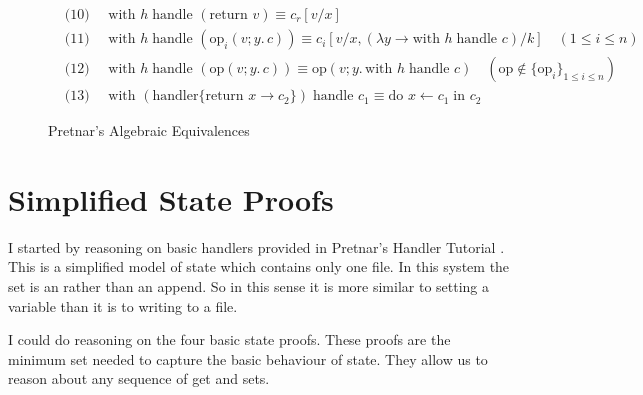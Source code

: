 \documentclass[logo,bsc,singlespacing,parskip]{infthesis}
\begin{document}
\begin{figure}[h]
    \begin{tcolorbox}[colframe=black, colback=white, sharp corners]
    \begin{align*}
        &\text{(10) } \quad \text{with } h \; \text{handle } (\text{return } v) \equiv c_r[v/x] \\
        &\text{(11) } \quad \text{with } h \; \text{handle } (\text{op}_i(v; y.\, c)) \equiv c_i[v/x, (\lambda y \rightarrow \text{with } h \; \text{handle } c)/k] \quad (1 \leq i \leq n) \\
        &\text{(12) } \quad \text{with } h \; \text{handle } (\text{op}(v; y.\, c)) \equiv \text{op}(v; y.\, \text{with } h \; \text{handle } c) \quad (\text{op} \notin \{\text{op}_i\}_{1 \leq i \leq n}) \\
        &\text{(13) } \quad \text{with } (\text{handler} \{\text{return } x \rightarrow c_2\}) \; \text{handle } c_1 \equiv \text{do } x \leftarrow c_1 \; \text{in } c_2
    \end{align*}
    \end{tcolorbox}

    \caption{Pretnar's Algebraic Equivalences}
    \label{fig:equational-laws}
\end{figure}





\section{Simplified State Proofs}
I started by reasoning on basic handlers provided in Pretnar's Handler Tutorial \cite{pretnar_introduction_2015}. This is a simplified model of state which contains only one file. In this system the set is an rather than an append. So in this sense it is more similar to setting a variable than it is to writing to a file.

I could do reasoning on the four basic state proofs. These proofs are the minimum set needed to capture the basic behaviour of state. They allow us to reason about any sequence of get and sets.



\end{document}

